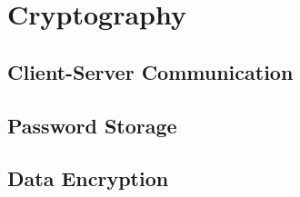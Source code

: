 \section{Cryptography}
  \subsection{Client-Server Communication}
  \subsection{Password Storage}
  \subsection{Data Encryption}